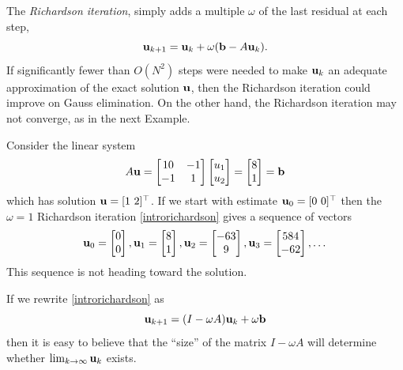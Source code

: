 The \emph{Richardson iteration}, simply adds a multiple $\omega$ of the last residual at each step,
\begin{equation}
\mathbf{u}_{k+1} = \mathbf{u}_k + \omega (\mathbf{b} - A \mathbf{u}_k).  \label{introrichardson}
\end{equation}
If significantly fewer than $O(N^2)$ steps were needed to make $\mathbf{u}_k$ an adequate approximation of the exact solution $\mathbf{u}$, then the Richardson iteration could improve on Gauss elimination.  On the other hand, the Richardson iteration may not converge, as in the next Example.

\newcommand{\rvect}[3]{\ensuremath{\bu_{#1} = \begin{bmatrix} #2 \\ #3 \end{bmatrix}}}

\medskip\noindent\hrulefill
\begin{example} Consider the linear system
\begin{equation}
A \mathbf{u}
= \begin{bmatrix}
10 & -1 \\ -1 & 1
\end{bmatrix}
\begin{bmatrix} u_1 \\ u_2 \end{bmatrix}
= \begin{bmatrix} 8 \\ 1 \end{bmatrix}
= \mathbf{b}
 \label{introexample}
\end{equation}
which has solution $\mathbf{u} = [1\,\, 2]^\top$.  If we start with estimate $\mathbf{u}_0 = [0\,\, 0]^\top$ then the $\omega=1$ Richardson iteration \eqref{introrichardson} gives a sequence of vectors %
\begin{equation}
\rvect{0}{0}{0}, \rvect{1}{8}{1}, \rvect{2}{-63}{9}, \rvect{3}{584}{-62}, \dots
\end{equation}
This sequence is not heading toward the solution.
\end{example}
\noindent\hrulefill

\medskip
If we rewrite \eqref{introrichardson} as
\begin{equation}
\mathbf{u}_{k+1} = (I - \omega A) \mathbf{u}_k + \omega \mathbf{b}  \label{introrewriterichardson}
\end{equation}
then it is easy to believe that the ``size'' of the matrix $I-\omega A$ will determine whether $\lim_{k\to\infty} \mathbf{u}_k$ exists.

